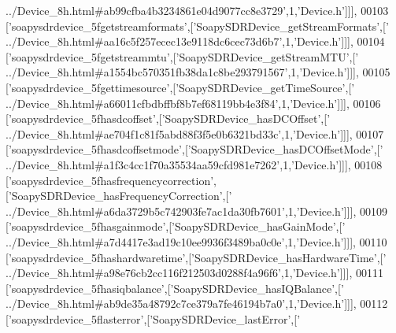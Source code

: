 \begin{DoxyCode}
{      ../Device\_8h.html#ab99cfba4b3234861e04d9077cc8e3729'},1,\textcolor{stringliteral}{'Device.h'}]]],
00103   [\textcolor{stringliteral}{'soapysdrdevice\_5fgetstreamformats'},[\textcolor{stringliteral}{'SoapySDRDevice\_getStreamFormats'},[\textcolor{stringliteral}{'
      ../Device\_8h.html#aa16c5f257ecec13e9118dc6cec73d6b7'},1,\textcolor{stringliteral}{'Device.h'}]]],
00104   [\textcolor{stringliteral}{'soapysdrdevice\_5fgetstreammtu'},[\textcolor{stringliteral}{'SoapySDRDevice\_getStreamMTU'},[\textcolor{stringliteral}{'
      ../Device\_8h.html#a1554bc570351fb38da1c8be293791567'},1,\textcolor{stringliteral}{'Device.h'}]]],
00105   [\textcolor{stringliteral}{'soapysdrdevice\_5fgettimesource'},[\textcolor{stringliteral}{'SoapySDRDevice\_getTimeSource'},[\textcolor{stringliteral}{'
      ../Device\_8h.html#a66011cfbdbffbf8b7ef68119bb4e3f84'},1,\textcolor{stringliteral}{'Device.h'}]]],
00106   [\textcolor{stringliteral}{'soapysdrdevice\_5fhasdcoffset'},[\textcolor{stringliteral}{'SoapySDRDevice\_hasDCOffset'},[\textcolor{stringliteral}{'
      ../Device\_8h.html#ae704f1c81f5abd88f3f5e0b6321bd33c'},1,\textcolor{stringliteral}{'Device.h'}]]],
00107   [\textcolor{stringliteral}{'soapysdrdevice\_5fhasdcoffsetmode'},[\textcolor{stringliteral}{'SoapySDRDevice\_hasDCOffsetMode'},[\textcolor{stringliteral}{'
      ../Device\_8h.html#a1f3c4cc1f70a35534aa59cfd981e7262'},1,\textcolor{stringliteral}{'Device.h'}]]],
00108   [\textcolor{stringliteral}{'soapysdrdevice\_5fhasfrequencycorrection'},[\textcolor{stringliteral}{'SoapySDRDevice\_hasFrequencyCorrection'},[\textcolor{stringliteral}{'
      ../Device\_8h.html#a6da3729b5c742903fe7ac1da30fb7601'},1,\textcolor{stringliteral}{'Device.h'}]]],
00109   [\textcolor{stringliteral}{'soapysdrdevice\_5fhasgainmode'},[\textcolor{stringliteral}{'SoapySDRDevice\_hasGainMode'},[\textcolor{stringliteral}{'
      ../Device\_8h.html#a7d4417e3ad19c10ee9936f3489ba0c0e'},1,\textcolor{stringliteral}{'Device.h'}]]],
00110   [\textcolor{stringliteral}{'soapysdrdevice\_5fhashardwaretime'},[\textcolor{stringliteral}{'SoapySDRDevice\_hasHardwareTime'},[\textcolor{stringliteral}{'
      ../Device\_8h.html#a98e76cb2cc116f212503d0288f4a96f6'},1,\textcolor{stringliteral}{'Device.h'}]]],
00111   [\textcolor{stringliteral}{'soapysdrdevice\_5fhasiqbalance'},[\textcolor{stringliteral}{'SoapySDRDevice\_hasIQBalance'},[\textcolor{stringliteral}{'
      ../Device\_8h.html#ab9de35a48792c7ce379a7fe46194b7a0'},1,\textcolor{stringliteral}{'Device.h'}]]],
00112   [\textcolor{stringliteral}{'soapysdrdevice\_5flasterror'},[\textcolor{stringliteral}{'SoapySDRDevice\_lastError'},[\textcolor{stringliteral}{'
}
\end{DoxyCode}
